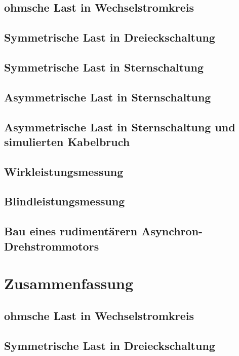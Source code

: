 \documentclass[12pt,english,ngerman]{scrartcl}
\begin{document}
\subsection{ohmsche Last in Wechselstromkreis}


\subsection{Symmetrische Last in Dreieckschaltung}


\subsection{Symmetrische Last in Sternschaltung}


\subsection{Asymmetrische Last in Sternschaltung}


\subsection{Asymmetrische Last in Sternschaltung und simulierten Kabelbruch}


\subsection{Wirkleistungsmessung}


\subsection{Blindleistungsmessung}


\subsection{Bau eines rudimentärern Asynchron-Drehstrommotors}

\section{Zusammenfassung}
\label{sec:zusammenfassung}

\subsection{ohmsche Last in Wechselstromkreis}


\subsection{Symmetrische Last in Dreieckschaltung}
\end{document}
